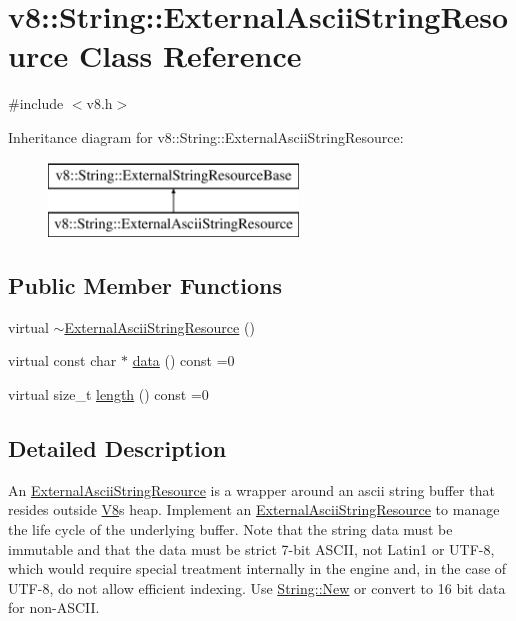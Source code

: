 \hypertarget{classv8_1_1_string_1_1_external_ascii_string_resource}{}\section{v8\+:\+:String\+:\+:External\+Ascii\+String\+Resource Class Reference}
\label{classv8_1_1_string_1_1_external_ascii_string_resource}


{\ttfamily \#include $<$v8.\+h$>$}

Inheritance diagram for v8\+:\+:String\+:\+:External\+Ascii\+String\+Resource\+:\begin{figure}[H]
\begin{center}
\leavevmode
\includegraphics[height=2.000000cm]{classv8_1_1_string_1_1_external_ascii_string_resource}
\end{center}
\end{figure}
\subsection*{Public Member Functions}
\begin{DoxyCompactItemize}
\item 
virtual \hyperlink{classv8_1_1_string_1_1_external_ascii_string_resource_acd8790ae14be1b90794b363d24a147d0}{$\sim$\+External\+Ascii\+String\+Resource} ()
\item 
virtual const char $\ast$ \hyperlink{classv8_1_1_string_1_1_external_ascii_string_resource_adeb99e8c8c630e2dac5ad76476249d2f}{data} () const =0
\item 
virtual size\+\_\+t \hyperlink{classv8_1_1_string_1_1_external_ascii_string_resource_aeecccc52434c2057d3dc5c9732458a8e}{length} () const =0
\end{DoxyCompactItemize}


\subsection{Detailed Description}
An \hyperlink{classv8_1_1_string_1_1_external_ascii_string_resource}{External\+Ascii\+String\+Resource} is a wrapper around an ascii string buffer that resides outside \hyperlink{classv8_1_1_v8}{V8}\textquotesingle{}s heap. Implement an \hyperlink{classv8_1_1_string_1_1_external_ascii_string_resource}{External\+Ascii\+String\+Resource} to manage the life cycle of the underlying buffer. Note that the string data must be immutable and that the data must be strict 7-\/bit A\+S\+C\+I\+I, not Latin1 or U\+T\+F-\/8, which would require special treatment internally in the engine and, in the case of U\+T\+F-\/8, do not allow efficient indexing. Use \hyperlink{classv8_1_1_string_a66188e5be9378cad8cbf953053de86bc}{String\+::\+New} or convert to 16 bit data for non-\/\+A\+S\+C\+I\+I. 

